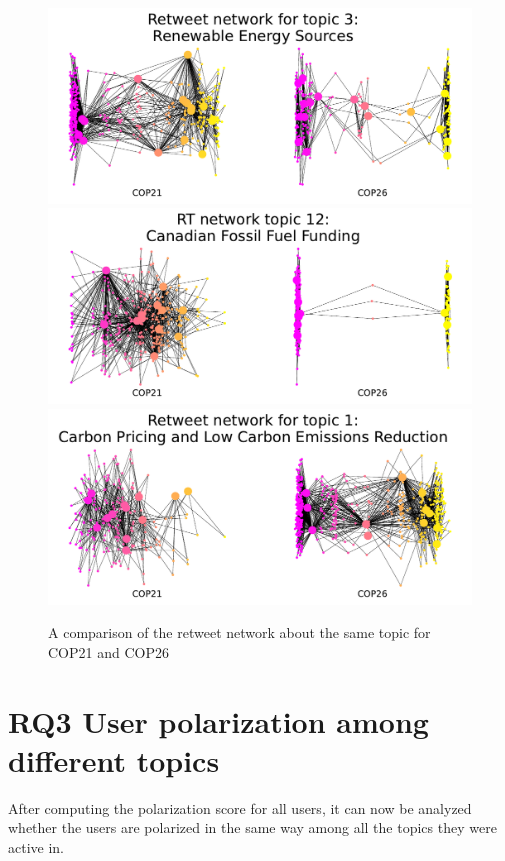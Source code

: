 \begin{figure}[H]
    \centering
    \includegraphics[width=0.95\linewidth]{Chapter5/figures/2x_topic3_network.pdf}
    \includegraphics[width=0.95\linewidth]{Chapter5/figures/2x_topic12_network.pdf}
    \includegraphics[width=0.95\linewidth]{Chapter5/figures/2x_topic1_network.pdf}
    \caption{A comparison of the retweet network about the same topic for COP21 and COP26}
    \label{fig:cop2x_network_comparison}
\end{figure}

\section{RQ3 User polarization among different topics}
After computing the polarization score for all users, it can now be analyzed whether the users are polarized in the same way among all the topics they were active in.

